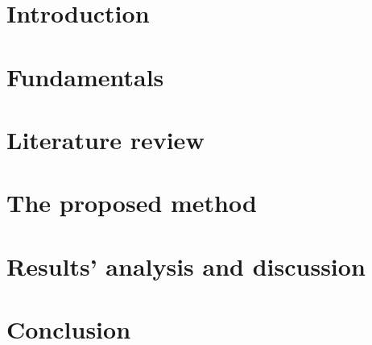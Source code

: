 \documentclass[msc, eng]{ita}    %
\begin{document}

\tableofcontents

\mainmatter

\chapter{Introduction}
\label{ch:introducao}


\chapter{Fundamentals}
\label{ch:fundamentacao}


\chapter{Literature review}
\label{ch:revisao}


\chapter{The proposed method}
\label{ch:metodologia}


%
%
%
%
%

\chapter{Results' analysis and discussion}
\label{ch:resultados}


\chapter{Conclusion}
\label{ch:conclusao}

\end{document}
